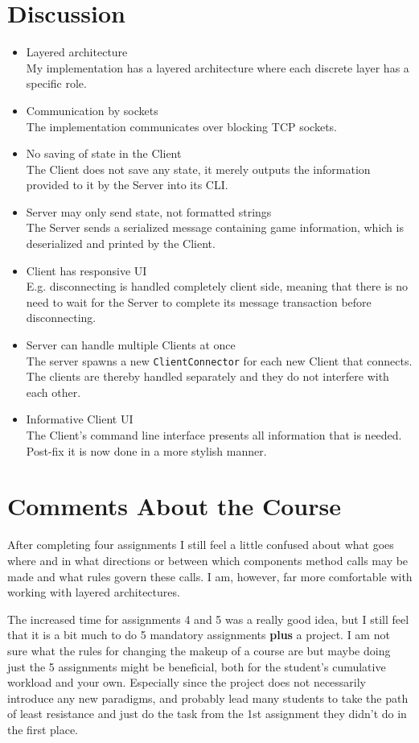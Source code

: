 \documentclass[a4paper]{scrartcl}
\begin{document}
\section{Discussion}

\begin{itemize}
	\item{
		Layered architecture\\
		My implementation has a layered architecture where each discrete layer has a specific role.
	}
	\item{
		Communication by sockets\\
		The implementation communicates over blocking TCP sockets.
	}
	\item{
		No saving of state in the Client\\
		The Client does not save any state, it merely outputs the information provided to it by the Server into its CLI.
	}
	\item{
		Server may only send state, not formatted strings\\
		The Server sends a serialized message containing game information, which is deserialized and printed by the Client.
	}
	\item{
		Client has responsive UI\\
		E.g. disconnecting is handled completely client side, meaning that there is no need to wait for the Server to complete its message transaction before disconnecting.
	}
	\item{
		Server can handle multiple Clients at once\\
		The server spawns a new \texttt{ClientConnector} for each new Client that connects.\\
		The clients are thereby handled separately and they do not interfere with each other.
	}
	\item{
		Informative Client UI\\
		The Client's command line interface presents all information that is needed. Post-fix it is now done in a more stylish manner.
	}
\end{itemize}


\section{Comments About the Course}

After completing four assignments I still feel a little confused about what goes where and in what directions or between which components method calls may be made and what rules govern these calls. I am, however, far more comfortable with working with layered architectures.

The increased time for assignments 4 and 5 was a really good idea, but I still feel that it is a bit much to do 5 mandatory  assignments \textbf{plus} a project. I am not sure what the rules for changing the makeup of a course are but maybe doing just the 5 assignments might be beneficial, both for the student's cumulative workload and your own. Especially since the project does not necessarily introduce any new paradigms, and probably lead many students to take the path of least resistance and just do the task from the 1st assignment they didn't do in the first place.
\end{document}
